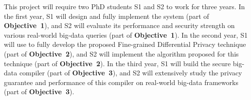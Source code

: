 This project will require two PhD students S1 and S2 to work for 
three years. In the first year, S1 will design and fully implement the \kakute 
system (part of \textbf{Objective~1}), and S2 will evaluate its performance 
and security strength on various real-world big-data queries (part of 
\textbf{Objective~1}). In the second year, S1 will 
use \kakute to fully develop the proposed Fine-grained Differential Privacy 
technique (part of \textbf{Objective~2}), and S2 will implement the 
algorithm proposed for this technique (part of \textbf{Objective~2}). In the 
third year, S1 will build the secure big-data compiler 
(part of \textbf{Objective~3}), and S2 will extensively study the privacy 
guarantee and performance of this compiler on real-world big-data 
frameworks (part of \textbf{Objective~3}).


